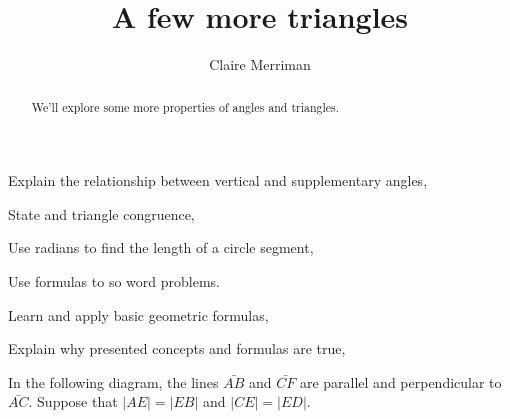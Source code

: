 \documentclass[noauthor,nooutcomes,handout]{../ximera}
\title{A few more triangles}
\author{Claire Merriman}
\begin{document}
\begin{abstract}
We'll explore some more properties of angles and triangles.\end{abstract}
\maketitle

\begin{listOutcomes}
\item Explain the relationship between vertical and supplementary angles,
\item State and triangle congruence,
\item Use radians to find the length of a circle segment,
\item Use formulas to so word problems.
\end{listOutcomes}

\begin{listObjectives}
\item Learn and apply basic geometric formulas,
\item Explain why presented concepts and formulas are true,
\end{listObjectives}
\mynewpage




In the following diagram, the lines $\bar{AB}$ and $\bar{CF}$ are parallel and perpendicular to $\bar{AC}$. Suppose that $\left\vert AE\right\vert =\left\vert
EB\right\vert $ and $\left\vert CE\right\vert =\left\vert
ED\right\vert $.
\end{document}
